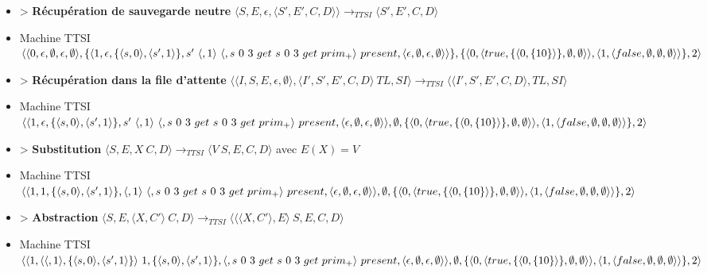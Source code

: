 \documentclass[10pt,a4paper]{article}
\begin{document}
\begin{itemize}
					\item[] > \textbf{Récupération de sauvegarde neutre} $\langle S,E,\epsilon,\langle S',E',C,D\rangle\rangle
					\longrightarrow_{TTSI} 
					\langle S',E',C,D\rangle$
					\item[] Machine TTSI $\langle\langle 0,\epsilon,\emptyset,\epsilon,\emptyset\rangle,\{\langle 1,\epsilon,\{\langle s,0\rangle,\langle s',1\rangle\}, s'~\langle,1\rangle~\langle,s~0~3~get~s~0~3~get~prim_{+}\rangle~present ,\\\langle\epsilon,\emptyset,\epsilon,\emptyset\rangle\rangle\},\{\langle 0,\langle true,\{\langle 0,\{10\}\rangle\},\emptyset,\emptyset\rangle\rangle,\langle 1,\langle false,\emptyset,\emptyset,\emptyset\rangle\rangle\},2\rangle$
					\item[] > \textbf{Récupération dans la file d'attente} $\langle\langle I,S,E,\epsilon,\emptyset\rangle,\langle I',S',E',C,D\rangle~TL,SI\rangle 
					\longrightarrow_{TTSI} 
					\langle\langle I',S',E',C,D\rangle,TL,SI\rangle$
					\item[] Machine TTSI $\langle\langle 1,\epsilon,\{\langle s,0\rangle,\langle s',1\rangle\}, s'~\langle,1\rangle~\langle,s~0~3~get~s~0~3~get~prim_{+}\rangle~present ,\langle\epsilon,\emptyset,\epsilon,\emptyset\rangle\rangle,\emptyset,\{\langle 0,\langle true,\{\langle 0,\{10\}\rangle\},\emptyset,\emptyset\rangle\rangle,\\\langle 1,\langle false,\emptyset,\emptyset,\emptyset\rangle\rangle\},2\rangle$
					\item[] > \textbf{Substitution} $\langle S,E,X~C,D\rangle
					\longrightarrow_{TTSI} 
					\langle V~S,E,C,D\rangle$ avec $E(X) = V$
					\item[] Machine TTSI $\langle\langle 1,1,\{\langle s,0\rangle,\langle s',1\rangle\}, \langle,1\rangle~\langle,s~0~3~get~s~0~3~get~prim_{+}\rangle~present ,\langle\epsilon,\emptyset,\epsilon,\emptyset\rangle\rangle,\emptyset,\{\langle 0,\langle true,\{\langle 0,\{10\}\rangle\},\emptyset,\emptyset\rangle\rangle,\\\langle 1,\langle false,\emptyset,\emptyset,\emptyset\rangle\rangle\},2\rangle$
					\item[] > \textbf{Abstraction} $\langle S,E,\langle X,C'\rangle~C,D\rangle
					\longrightarrow_{TTSI} 
					\langle \langle\langle X,C'\rangle,E\rangle~S,E,C,D\rangle$
					\item[] Machine TTSI $\langle\langle 1,\langle\langle,1\rangle,\{\langle s,0\rangle,\langle s',1\rangle\}\rangle~1,\{\langle s,0\rangle,\langle s',1\rangle\}, \langle,s~0~3~get~s~0~3~get~prim_{+}\rangle~present ,\langle\epsilon,\emptyset,\epsilon,\emptyset\rangle\rangle,\emptyset,\\\{\langle 0,\langle true,\{\langle 0,\{10\}\rangle\},\emptyset,\emptyset\rangle\rangle,\langle 1,\langle false,\emptyset,\emptyset,\emptyset\rangle\rangle\},2\rangle$

\end{itemize}
\end{document}
